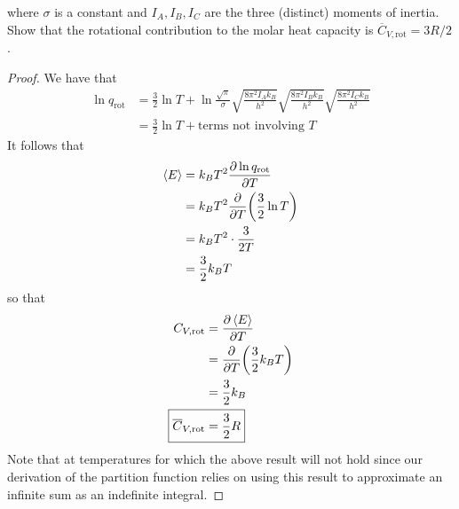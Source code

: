 \documentclass[../psets.tex]{subfiles}
\begin{document}
\begin{enumerate}
\begin{equation*}
    \end{equation*}
    where $\sigma$ is a constant and $I_A,I_B,I_C$ are the three (distinct) moments of inertia. Show that the rotational contribution to the molar heat capacity is $\overline{C}_{V,\text{rot}}=3R/2$.
    \begin{proof}
        We have that
        \begin{align*}
            \ln q_\text{rot} &= \frac{3}{2}\ln T+\ln\frac{\sqrt{\pi}}{\sigma}\sqrt{\frac{8\pi^2I_Ak_B}{h^2}}\sqrt{\frac{8\pi^2I_Bk_B}{h^2}}\sqrt{\frac{8\pi^2I_Ck_B}{h^2}}\\
            &= \frac{3}{2}\ln T+\text{terms not involving }T
        \end{align*}
        It follows that
        \begin{align*}
            \left\langle{E}\right\rangle &= k_BT^2\pdv{\ln q_\text{rot}}{T}\\
            &= k_BT^2\pdv{T}(\frac{3}{2}\ln T)\\
            &= k_BT^2\cdot\frac{3}{2T}\\
            &= \frac{3}{2}k_BT
        \end{align*}
        so that
        \begin{align*}
            C_{V,\text{rot}} &= \pdv{\prb{E}}{T}\\
            &= \pdv{T}(\frac{3}{2}k_BT)\\
            &= \frac{3}{2}k_B\\
            \Aboxed{\overline{C}_{V,\text{rot}} &= \frac{3}{2}R}
        \end{align*}
        Note that at temperatures for which  the above result will not hold since our derivation of the partition function relies on using this result to approximate an infinite sum as an indefinite integral.
    \end{proof}
\end{enumerate}
\end{document}
